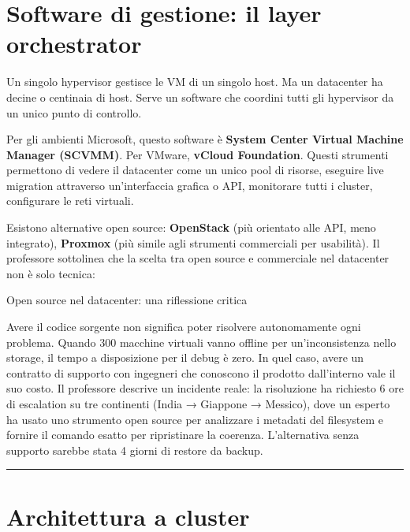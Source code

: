 \documentclass[
  italian,
  openany]{book}
\begin{document}
\section{Software di gestione: il layer
orchestrator}\label{software-di-gestione-il-layer-orchestrator}

Un singolo hypervisor gestisce le VM di un singolo host. Ma un
datacenter ha decine o centinaia di host. Serve un software che coordini
tutti gli hypervisor da un unico punto di controllo.

Per gli ambienti Microsoft, questo software è \textbf{System Center
Virtual Machine Manager (SCVMM)}. Per VMware, \textbf{vCloud
Foundation}. Questi strumenti permettono di vedere il datacenter come un
unico pool di risorse, eseguire live migration attraverso un'interfaccia
grafica o API, monitorare tutti i cluster, configurare le reti virtuali.

Esistono alternative open source: \textbf{OpenStack} (più orientato alle
API, meno integrato), \textbf{Proxmox} (più simile agli strumenti
commerciali per usabilità). Il professore sottolinea che la scelta tra
open source e commerciale nel datacenter non è solo tecnica:

\begin{calloutwarning}{Open source nel datacenter: una riflessione critica}

Avere il codice sorgente non significa poter risolvere autonomamente
ogni problema. Quando 300 macchine virtuali vanno offline per
un'inconsistenza nello storage, il tempo a disposizione per il debug è
zero. In quel caso, avere un contratto di supporto con ingegneri che
conoscono il prodotto dall'interno vale il suo costo. Il professore
descrive un incidente reale: la risoluzione ha richiesto 6 ore di
escalation su tre continenti (India → Giappone → Messico), dove un
esperto ha usato uno strumento open source per analizzare i metadati del
filesystem e fornire il comando esatto per ripristinare la coerenza.
L'alternativa senza supporto sarebbe stata 4 giorni di restore da
backup.

\end{calloutwarning}

\begin{center}\rule{0.5\linewidth}{0.5pt}\end{center}

\section{Architettura a cluster}\label{architettura-a-cluster}
\end{document}
